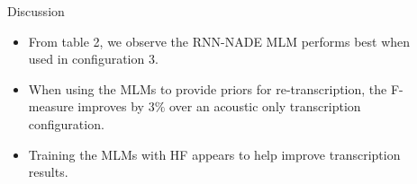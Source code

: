 \documentclass[final]{beamer}
\newlength{\sepwid}
\newlength{\onecolwid}
\newlength{\twocolwid}
\begin{document}
\begin{frame}[t]
\begin{columns}[t]
\begin{column}{\twocolwid}








\end{column} %

\begin{column}{\sepwid}\end{column} %

\begin{column}{\onecolwid} %


\begin{block}{Discussion}

\begin{itemize}
\item From table 2, we observe the RNN-NADE MLM performs best when used in configuration 3.
\item When using the MLMs to provide priors for re-transcription, the F-measure improves by $3\%$ over an acoustic only transcription configuration.
\item Training the MLMs with HF appears to help improve transcription results.
\end{itemize}


\end{block}
\end{column}
\end{columns}
\end{frame}
\end{document}
